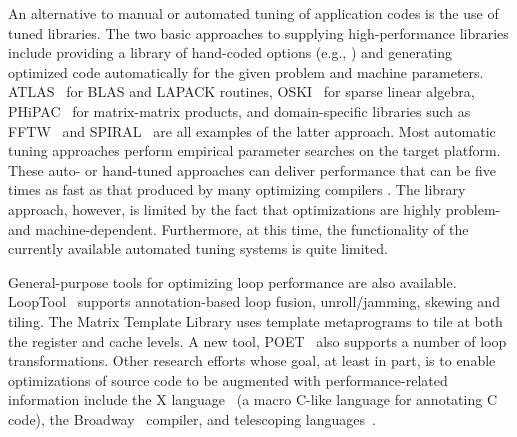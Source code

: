 An alternative to manual or automated tuning of application codes is the use
of tuned libraries. The two basic approaches to supplying high-performance
libraries include providing a library of hand-coded options (e.g.,
\cite{BLAS,ESSL,Goto:2006fk}) and generating optimized code automatically
for the given problem and machine parameters. 
ATLAS~\cite{atlas_sc98}
for BLAS and LAPACK
routines, OSKI~\cite{OSKI} for sparse linear algebra,
PHiPAC~\cite{bilmes97optimizing} for matrix-matrix products, and
domain-specific libraries such as FFTW~\cite{frigo98} and
SPIRAL~\cite{SPIRAL} are all examples of the latter approach. Most 
automatic tuning approaches perform empirical
parameter searches on the target platform.  
These auto- or hand-tuned
approaches can deliver performance that can be five times as fast as that
produced by many optimizing compilers \cite{WN147}.  The library approach,
however, is limited by the fact that optimizations are highly problem- and
machine-dependent. Furthermore, at this time, the functionality of the
currently available automated tuning systems is quite limited.

General-purpose tools for optimizing loop performance are also available.
LoopTool~\cite{LoopTool} supports annotation-based loop fusion,
unroll/jamming, skewing and tiling.  The Matrix Template Library
\cite{Siek:1998ys} uses template metaprograms to tile at both the register
and cache levels.  A new tool, POET~\cite{POET} also supports a number of
loop transformations. 
Other research efforts whose goal, at least in part, is to enable
optimizations of source code to be augmented with performance-related
information include the X language~\cite{XLanguage} (a macro C-like language
for annotating C code), the Broadway~\cite{broadway} compiler, and
telescoping languages~\cite{telescopingurl}.

